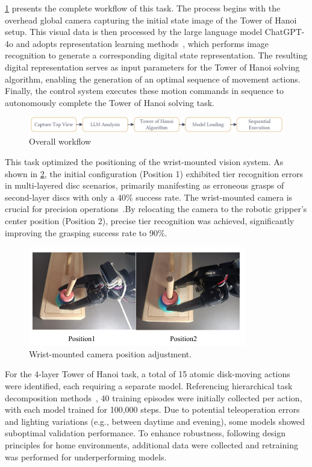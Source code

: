 \documentclass[runningheads]{llncs}
\begin{document}
\cref{fig10} presents the complete workflow of this task. The process begins with the overhead global camera capturing the initial state image of the Tower of Hanoi setup. This visual data is then processed by the large language model ChatGPT-4o and adopts representation learning methods~\cite{ref5}, which performs image recognition to generate a corresponding digital state representation. The resulting digital representation serves as input parameters for the Tower of Hanoi solving algorithm, enabling the generation of an optimal sequence of movement actions. Finally, the control system executes these motion commands in sequence to autonomously complete the Tower of Hanoi solving task.

\begin{figure}[htbp]
\centering
\includegraphics[width=\textwidth]{10}
\caption{Overall workflow}
 \label{fig10}
\end{figure}

This task optimized the positioning of the wrist-mounted vision system. As shown in \cref{fig12}, the initial configuration (Position 1) exhibited tier recognition errors in multi-layered disc scenarios, primarily manifesting as erroneous grasps of second-layer discs with only a 40\% success rate. The wrist-mounted camera is crucial for precision operations~\cite{ref6}.By relocating the camera to the robotic gripper's center position (Position 2), precise tier recognition was achieved, significantly improving the grasping success rate to 90\%.

\begin{figure}[htbp]
\centering
\includegraphics[width=0.85\textwidth]{fig12.pdf}
\caption{Wrist-mounted camera position adjustment.} \label{fig12}
\end{figure}



For the 4-layer Tower of Hanoi task, a total of 15 atomic disk-moving actions were identified, each requiring a separate model. Referencing hierarchical task decomposition methods~\cite{ref7}, 40 training episodes were initially collected per action, with each model trained for 100,000 steps. Due to potential teleoperation errors and lighting variations (e.g., between daytime and evening)\cite{ref8}, some models showed suboptimal validation performance. To enhance robustness, following design principles for home environments\cite{ref9}, additional data were collected and retraining was performed for underperforming models.
\end{document}
